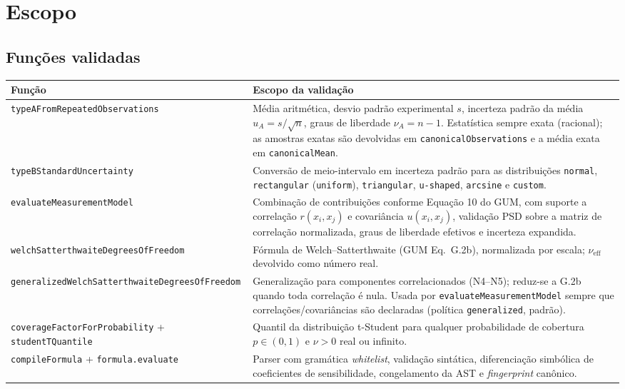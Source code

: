 \documentclass[11pt,a4paper]{article}
\begin{document}
\section{Escopo}
\label{sec:escopo}

\subsection{Funções validadas}

\begin{table}[H]
  \centering
  \small
  \begin{tabularx}{\textwidth}{l X}
    \toprule
    \textbf{Função} & \textbf{Escopo da validação} \\
    \midrule
    \texttt{typeAFromRepeatedObservations} & Média aritmética, desvio padrão experimental \(s\), incerteza padrão da média \(u_A = s/\sqrt{n}\), graus de liberdade \(\nu_A = n - 1\). Estatística sempre exata (racional); as amostras exatas são devolvidas em \texttt{canonicalObservations} e a média exata em \texttt{canonicalMean}. \\
    \texttt{typeBStandardUncertainty} & Conversão de meio-intervalo em incerteza padrão para as distribuições \texttt{normal}, \texttt{rectangular} (\texttt{uniform}), \texttt{triangular}, \texttt{u-shaped}, \texttt{arcsine} e \texttt{custom}. \\
    \texttt{evaluateMeasurementModel} & Combinação de contribuições conforme Equação 10 do GUM, com suporte a correlação \(r(x_i, x_j)\) e covariância \(u(x_i, x_j)\), validação PSD sobre a matriz de correlação normalizada, graus de liberdade efetivos e incerteza expandida. \\
    \texttt{welchSatterthwaiteDegreesOfFreedom} & Fórmula de Welch--Satterthwaite (GUM Eq.~G.2b), normalizada por escala; \(\nu_{\text{eff}}\) devolvido como número real. \\
    \texttt{generalizedWelchSatterthwaiteDegreesOfFreedom} & Generalização para componentes correlacionados (N4--N5); reduz-se a G.2b quando toda correlação é nula. Usada por \texttt{evaluateMeasurementModel} sempre que correlações/covariâncias são declaradas (política \texttt{generalized}, padrão). \\
    \texttt{coverageFactorForProbability} + \texttt{studentTQuantile} & Quantil da distribuição t-Student para qualquer probabilidade de cobertura \(p \in (0,1)\) e \(\nu > 0\) real ou infinito. \\
    \texttt{compileFormula} + \texttt{formula.evaluate} & Parser com gramática \emph{whitelist}, validação sintática, diferenciação simbólica de coeficientes de sensibilidade, congelamento da AST e \emph{fingerprint} canônico. \\
    \bottomrule
  \end{tabularx}
\end{table}
\end{document}
